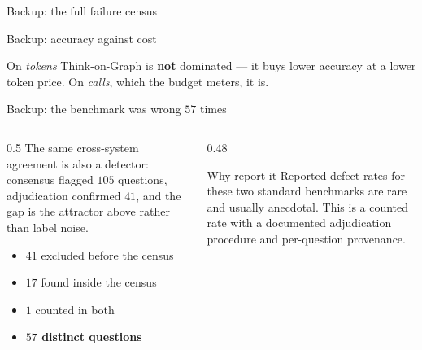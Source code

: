 \begin{frame}{Backup: the full failure census}
  \centering
  \resizebox{\textwidth}{!}{%
    }
\end{frame}

\begin{frame}{Backup: accuracy against cost}
  \centering
  

  \vspace{1mm}
  {\small On \emph{tokens} Think-on-Graph is \textbf{not} dominated --- it buys
  lower accuracy at a lower token price. On \emph{calls}, which the budget
  meters, it is.}
\end{frame}

\begin{frame}{Backup: the benchmark was wrong $57$ times}
  \begin{columns}[T]
    \begin{column}{0.5\textwidth}
      \small
      The same cross-system agreement is also a \alert{\mbox{detector}}:
      consensus flagged $105$ questions, adjudication confirmed $41$, and the
      gap is the attractor above rather than label noise.
      \begin{itemize}
        \item $41$ excluded before the census
        \item $17$ found inside the census
        \item $1$ counted in both
        \item[$\Rightarrow$] \textbf{$57$ distinct questions}
      \end{itemize}
    \end{column}
    \begin{column}{0.48\textwidth}
      \begin{block}{Why report it}
        \small
        Reported defect rates for these two standard benchmarks are rare and
        usually anecdotal. This is a counted rate with a documented
        adjudication procedure and per-question provenance.
      \end{block}
    \end{column}
  \end{columns}
\end{frame}
